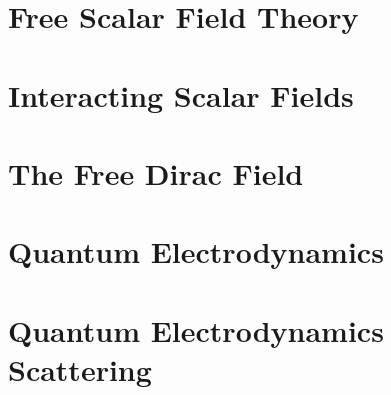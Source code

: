 \documentclass{momento}
\begin{document}


\chapter{Free Scalar Field Theory}
\label{cha:free-scalar-field}



\chapter{Interacting Scalar Fields}
\label{cha:inter-scal-fields}


\chapter{The Free Dirac Field}
\label{cha:free-dirac-field}


\chapter{Quantum Electrodynamics}
\label{cha:quant-electr}


\chapter{Quantum Electrodynamics Scattering}
\label{cha:quant-electr-scatt}



% 




% 


% 
\end{document}
